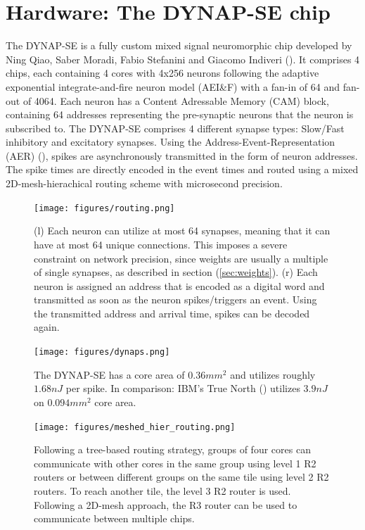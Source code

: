 \documentclass[twoside,11pt]{article}
\begin{document}
\newpage

\section{Hardware: The DYNAP-SE chip} \label{sec:DYNAP-SE}
The DYNAP-SE is a fully custom mixed signal neuromorphic chip developed by Ning Qiao, Saber Moradi,
Fabio Stefanini and Giacomo Indiveri (\cite{DBLP:journals/corr/abs-1708-04198}). It comprises 4 chips, each containing 4 cores with
4x256 neurons following the adaptive exponential integrate-and-fire neuron model (AEI\&F) with a fan-in of 64 and fan-out of 4064.
Each neuron has a Content Adressable Memory (CAM) block, containing 64 addresses representing the pre-synaptic
neurons that the neuron is subscribed to. The DYNAP-SE comprises 4 different synapse types: Slow/Fast
inhibitory and excitatory synapses. Using the Address-Event-Representation (AER) (\cite{Deiss:1999:PCI:296533.296540}), spikes are asynchronously
transmitted in the form of neuron addresses. The spike times are directly encoded in the event times and routed
using a mixed 2D-mesh-hierachical routing scheme with microsecond precision.

\begin{figure}[!htb]
  \texttt{[image: figures/routing.png]}
  \caption{(l) Each neuron can utilize at most 64 synapses, meaning that it can have at most 64 unique connections.
  This imposes a severe constraint on network precision, since weights are usually a multiple of single synapses,
  as described in section (\ref{sec:weights}). (r) Each neuron is assigned an address that is encoded as a digital
  word and transmitted as soon as the neuron spikes/triggers an event. Using the transmitted address and
  arrival time, spikes can be decoded again.}
  \label{fig:routing}
\end{figure}

\begin{figure}[!htb]
  \centering
  \texttt{[image: figures/dynaps.png]}
  \caption{The DYNAP-SE has a core area of $0.36mm^2$ and utilizes roughly $1.68nJ$ per spike.
  In comparison: IBM's True North (\cite{Cassidy2016TrueNorthAH}) utilizes $3.9nJ$ on $0.094mm^2$ core area.}
  \label{fig:routing}
\end{figure}


\newpage

\begin{figure}[!htb]
  \centering
  \texttt{[image: figures/meshed\_hier\_routing.png]}
  \caption{Following a tree-based routing strategy, groups of four cores can communicate with other cores in the same
  group using level 1 R2 routers or between different groups on the same tile using level 2 R2 routers. To reach
  another tile, the level 3 R2 router is used. Following a 2D-mesh approach, the R3 router can be used to communicate
  between multiple chips.}
  \label{fig:routing}
\end{figure}
\end{document}
